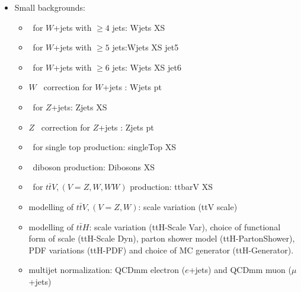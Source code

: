 \begin{itemize}
\item  Small backgrounds: 
 \begin{itemize}
 \item \xsec\ for $W$+jets with $\geq 4$ jets: Wjets XS
 \item \xsec\ for $W$+jets with $\geq 5$ jets:Wjets XS jet5
 \item \xsec\ for $W$+jets with $\geq 6$ jets: Wjets XS jet6
 \item $W$ \pt\ correction for $W$+jets : Wjets pt
  \item \xsec\ for $Z$+jets: Zjets XS
 \item $Z$ \pt\ correction for $Z$+jets : Zjets pt
 \item \xsec\ for single top production: singleTop XS
 \item \xsec\ diboson production: Dibosons XS
 \item \xsec\ for $t\bar{t}V, (V = Z, W, WW)$ production: ttbarV XS
 \item modelling of $t\bar{t}V, (V = Z, W)$: scale variation (ttV scale)
 \item modelling of $t\bar{t}H$: scale variation (ttH-Scale Var), choice of functional form of scale (ttH-Scale Dyn), parton shower model (ttH-PartonShower), PDF variations (ttH-PDF) and choice of MC generator (ttH-Generator).
 \item multijet normalization: QCDmm electron ($e$+jets) and QCDmm muon ($\mu$+jets)
\end{itemize}

\end{itemize}

